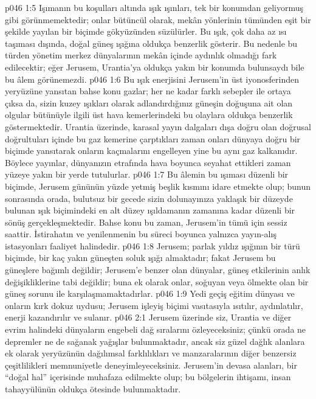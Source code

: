 \vs p046 1:5 Işımanın bu koşulları altında ışık ışınları, tek bir konumdan geliyormuş gibi görünmemektedir; onlar bütüncül olarak, mekân yönlerinin tümünden eşit bir şekilde yayılan bir biçimde gökyüzünden süzülürler. Bu ışık, çok daha az ısı taşıması dışında, doğal güneş ışığına oldukça benzerlik gösterir. Bu nedenle bu türden yönetim merkez dünyalarının mekân içinde aydınlık olmadığı fark edilecektir; eğer Jerusem, Urantia’ya oldukça yakın bir konumda bulunsaydı bile bu âlem görünemezdi.
\vs p046 1:6 Bu ışık enerjisini Jerusem’in üst iyonosferinden yeryüzüne yansıtan bahse konu gazlar; her ne kadar farklı sebepler ile ortaya çıksa da, sizin kuzey ışıkları olarak adlandırdığınız güneşin doğuşuna ait olan olgular bütünüyle ilgili üst hava kemerlerindeki bu olaylara oldukça benzerlik göstermektedir. Urantia üzerinde, karasal yayın dalgaları dışa doğru olan doğrusal doğrultuları içinde bu gaz kemerine çarptıkları zaman onları dünyaya doğru bir biçimde yansıtarak onların kaçmalarını engelleyen yine bu aynı gaz kalkanıdır. Böylece yayınlar, dünyanızın etrafında hava boyunca seyahat ettikleri zaman yüzeye yakın bir yerde tutulurlar.
\vs p046 1:7 Bu âlemin bu ışıması düzenli bir biçimde, Jerusem gününün yüzde yetmiş beşlik kısmını idare etmekte olup; bunun sonrasında orada, bulutsuz bir gecede sizin dolunayınıza yaklaşık bir düzeyde bulunan ışık biçimindeki en alt düzey ışıldamanın zamanına kadar düzenli bir sönüş gerçekleşmektedir. Bahse konu bu zaman, Jerusem’in tümü için sessiz saattir. İstirahatın ve yenilenmenin bu süreci boyunca yalnızca yayın\hyp{}alış istasyonları faaliyet halindedir.
\vs p046 1:8 Jerusem; parlak yıldız ışığının bir türü biçimde, bir kaç yakın güneşten soluk ışığı almaktadır; fakat Jerusem bu güneşlere bağımlı değildir; Jerusem’e benzer olan dünyalar, güneş etkilerinin anlık değişikliklerine tabi değildir; buna ek olarak onlar, soğuyan veya ölmekte olan bir güneş sorunu ile karşılaşmamaktadırlar.
\vs p046 1:9 Yedi geçiş eğitim dünyası ve onların kırk dokuz uydusu; Jerusem işleyiş biçimi vasıtasıyla ısıtılır, aydınlatılır, enerji kazandırılır ve sulanır.
\vs p046 2:1 Jerusem üzerinde siz, Urantia ve diğer evrim halindeki dünyaların engebeli dağ sıralarını özleyeceksiniz; çünkü orada ne depremler ne de sağanak yağışlar bulunmaktadır, ancak siz güzel dağlık alanlara ek olarak yeryüzünün dağılımsal farklılıkları ve manzaralarının diğer benzersiz çeşitlilikleri memnuniyetle deneyimleyeceksiniz. Jerusem’in devasa alanları, bir “doğal hal” içerisinde muhafaza edilmekte olup; bu bölgelerin ihtişamı, insan tahayyülünün oldukça ötesinde bulunmaktadır.
